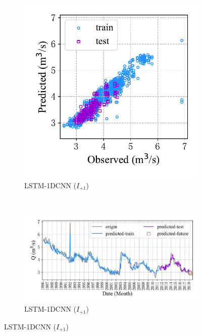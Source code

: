 \begin{figure}[!htbp]
  \centering
  \begin{subfigure}[b]{0.305\textwidth}
    \includegraphics[width=\textwidth]{Img/chap4_spr/out3/spr_scatter_in_1_out_3_lstm_cnn.pdf}
    \vspace{-1.2cm}
    \caption{LSTM-1DCNN ($I_{+1}$)}
    \label{fig:spr_scatter_in_1_out_3_lstm_cnn}
  \end{subfigure}
  ~
  \begin{subfigure}[b]{0.615\textwidth}
    \includegraphics[width=\textwidth]{Img/chap4_spr/out3/spr_series_in_1_out_3_lstm_cnn.pdf}
    \vspace{-1.2cm}
    \caption{LSTM-1DCNN ($I_{+1}$)}
    \label{fig:spr_series_in_1_out_3_lstm_cnn}

\end{subfigure}
\end{figure}
